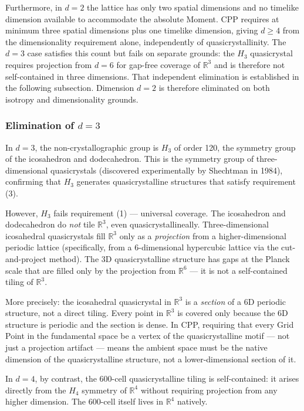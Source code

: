 \documentclass[11pt,letterpaper]{article}
\begin{document}
Furthermore, in $d = 2$ the lattice has only two spatial dimensions 
and no timelike dimension available to accommodate the absolute 
Moment. CPP requires at minimum three spatial dimensions plus one timelike
dimension, giving $d \geq 4$ from the dimensionality requirement alone,
independently of quasicrystallinity. The $d = 3$ case satisfies this
count but fails on separate grounds: the $H_3$ quasicrystal requires
projection from $d = 6$ for gap-free coverage of $\mathbb{R}^3$ and is
therefore not self-contained in three dimensions. That independent
elimination is established in the following subsection. Dimension $d = 2$ is therefore 
eliminated on both isotropy and dimensionality grounds.

\subsubsection{Elimination of $d = 3$}

In $d = 3$, the non-crystallographic group is $H_3$ of order 120, 
the symmetry group of the icosahedron and dodecahedron. This is the 
symmetry group of three-dimensional quasicrystals (discovered 
experimentally by Shechtman in 1984), confirming that $H_3$ 
generates quasicrystalline structures that satisfy requirement (3).

However, $H_3$ fails requirement (1) — universal coverage. The 
icosahedron and dodecahedron do \emph{not} tile $\mathbb{R}^3$, 
even quasicrystallineally. Three-dimensional icosahedral 
quasicrystals fill $\mathbb{R}^3$ only as a \emph{projection} from 
a higher-dimensional periodic lattice (specifically, from a 
6-dimensional hypercubic lattice via the cut-and-project method). 
The 3D quasicrystalline structure has gaps at the Planck scale that 
are filled only by the projection from $\mathbb{R}^6$ — it is not 
a self-contained tiling of $\mathbb{R}^3$.

More precisely: the icosahedral quasicrystal in $\mathbb{R}^3$ is 
a \emph{section} of a 6D periodic structure, not a direct tiling. 
Every point in $\mathbb{R}^3$ is covered only because the 6D 
structure is periodic and the section is dense. In CPP, requiring 
that every Grid Point in the fundamental space be a vertex of the 
quasicrystalline motif — not just a projection artifact — means the 
ambient space must be the native dimension of the quasicrystalline 
structure, not a lower-dimensional section of it.

In $d = 4$, by contrast, the 600-cell quasicrystalline tiling is 
self-contained: it arises directly from the $H_4$ symmetry of 
$\mathbb{R}^4$ without requiring projection from any higher 
dimension. The 600-cell itself lives in $\mathbb{R}^4$ natively.
\end{document}
